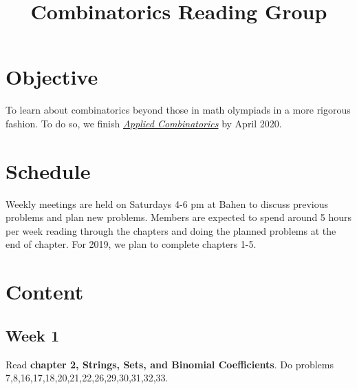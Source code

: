 \documentclass[12pt]{article}
\begin{document}
	
	
\title{Combinatorics Reading Group}
\maketitle
	
\section{Objective}
To learn about combinatorics beyond those in math olympiads in a more rigorous fashion. To do so, we finish \textit{\href{https://open.umn.edu/opentextbooks/textbooks/applied-combinatorics}{Applied Combinatorics}} by April 2020.

\section{Schedule}
Weekly meetings are held on Saturdays 4-6 pm at Bahen to discuss previous problems and plan new problems. Members are expected to spend around 5 hours per week reading through the chapters and doing the planned problems at the end of chapter. For 2019, we plan to complete chapters 1-5.

\section{Content}
	\subsection{Week 1}
	Read \textbf{chapter 2, Strings, Sets, and Binomial Coefficients}. Do problems 7,8,16,17,18,20,21,22,26,29,30,31,32,33.
\end{document}
